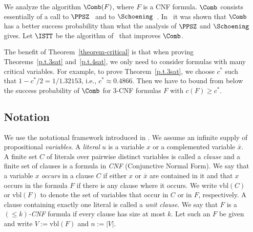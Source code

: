 We analyze the algorithm $\Comb(F)$, where $F$ is a CNF formula.
$\Comb$ consists essentially of a call to $\PPSZ$~\cite{ppsz} and to
$\Schoening$~\cite{schoning1999}. In~\cite{it04} it was shown that
$\Comb$ has a better success probability than what the analysis of $\PPSZ$ and
$\Schoening$ gives. Let $\ISTT$ be the algorithm of~\cite{istt10} that improves $\Comb$.
\begin{theorem}
\label{p.t.3sat}
\end{theorem}
\begin{theorem}
\label{guess-istt}
\end{theorem}
\theoremAppendixExplanation
\begin{theorem}
\label{guess-istt-weak}
\end{theorem}

\begin{theorem}
\label{p.t.4sat}
\end{theorem}
The benefit of Theorem~\ref{theorem-critical} is that when proving
Theorems~\ref{p.t.3sat} and~\ref{p.t.4sat}, we only need to consider
formulas with many critical variables.  For example, to prove
Theorem~\ref{p.t.3sat}, we choose $c^*$ such that $1-c^*/2 =
1/1.32153$, i.e., $c^* \approx 0.4866$. Then we have to bound from
below the success probability of $\Comb$ for $3$-CNF formulas $F$ with
$c(F) \geq c^*$.
\subsection{Notation}
We use the notational framework introduced in \cite{welzl05}. We
assume an infinite supply of propositional \emph{variables}. A
\emph{literal} $u$ is a variable $x$ or a complemented variable $\bar
x$. A finite set $C$ of literals over pairwise distinct variables is
called a \emph{clause} and a finite set of clauses is a formula
in \emph{CNF} (Conjunctive Normal Form). We say that a variable $x$
\emph{occurs} in a clause $C$ if either $x$ or $\bar x$ are contained
in it and that $x$ occurs in the formula $F$ if there is any clause
where it occurs. 
We write $\mbox{vbl}(C)$ or $\mbox{vbl}(F)$ to denote
the set of variables that occur in $C$ or in $F$, respectively. 
A clause containing exactly one literal is called a \emph{unit clause}. We
say that $F$ is a 
$(\le k)$\emph{-CNF} formula
if every clause has
size at most $k$.  Let such an $F$ be given and write
$V:=\mbox{vbl}(F)$ and $n:=|V|$.

